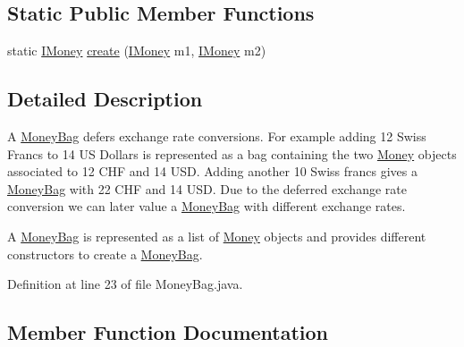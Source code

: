 \subsection*{Static Public Member Functions}
\begin{DoxyCompactItemize}
\item 
static \mbox{\hyperlink{interfacees_1_1deusto_1_1testing_1_1junit_1_1_i_money}{I\+Money}} \mbox{\hyperlink{classes_1_1deusto_1_1testing_1_1junit_1_1_money_bag_a8d2d54a342d2de2b75530600123efc9a}{create}} (\mbox{\hyperlink{interfacees_1_1deusto_1_1testing_1_1junit_1_1_i_money}{I\+Money}} m1, \mbox{\hyperlink{interfacees_1_1deusto_1_1testing_1_1junit_1_1_i_money}{I\+Money}} m2)
\end{DoxyCompactItemize}


\subsection{Detailed Description}
A \mbox{\hyperlink{classes_1_1deusto_1_1testing_1_1junit_1_1_money_bag}{Money\+Bag}} defers exchange rate conversions. For example adding 12 Swiss Francs to 14 US Dollars is represented as a bag containing the two \mbox{\hyperlink{classes_1_1deusto_1_1testing_1_1junit_1_1_money}{Money}} objects associated to 12 C\+HF and 14 U\+SD. Adding another 10 Swiss francs gives a \mbox{\hyperlink{classes_1_1deusto_1_1testing_1_1junit_1_1_money_bag}{Money\+Bag}} with 22 C\+HF and 14 U\+SD. Due to the deferred exchange rate conversion we can later value a \mbox{\hyperlink{classes_1_1deusto_1_1testing_1_1junit_1_1_money_bag}{Money\+Bag}} with different exchange rates.

A \mbox{\hyperlink{classes_1_1deusto_1_1testing_1_1junit_1_1_money_bag}{Money\+Bag}} is represented as a list of \mbox{\hyperlink{classes_1_1deusto_1_1testing_1_1junit_1_1_money}{Money}} objects and provides different constructors to create a \mbox{\hyperlink{classes_1_1deusto_1_1testing_1_1junit_1_1_money_bag}{Money\+Bag}}. 

Definition at line 23 of file Money\+Bag.\+java.



\subsection{Member Function Documentation}
\mbox{\label{classes_1_1deusto_1_1testing_1_1junit_1_1_money_bag_ab3be83ff12fa6d19b67b669194120d00}} 
